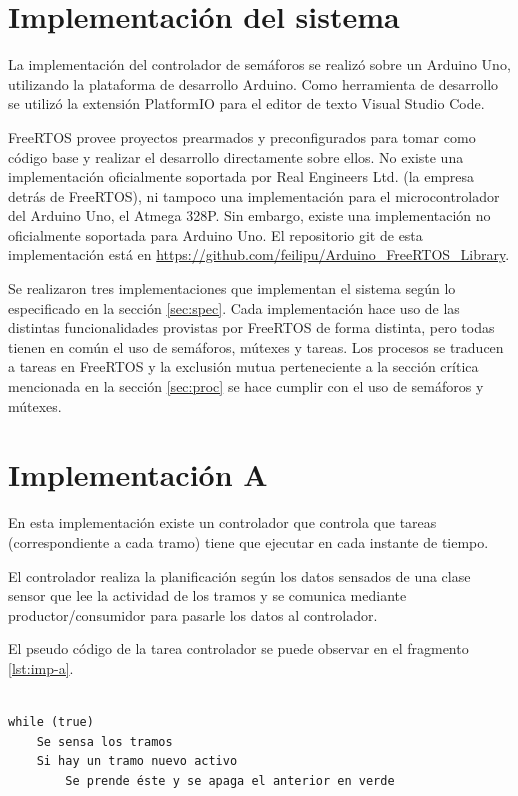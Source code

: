\section{Implementación del sistema}
La implementación del controlador de semáforos se realizó sobre un Arduino Uno, utilizando la plataforma de desarrollo Arduino. Como herramienta de desarrollo se utilizó la extensión PlatformIO para el editor de texto Visual Studio Code.

FreeRTOS provee proyectos prearmados y preconfigurados para tomar como código base y realizar el desarrollo directamente sobre ellos. No existe una implementación oficialmente soportada por Real Engineers Ltd. (la empresa detrás de FreeRTOS), ni tampoco una implementación para el microcontrolador del Arduino Uno, el Atmega 328P. Sin embargo, existe una implementación no oficialmente soportada para Arduino Uno. El repositorio git de esta implementación está en \url{https://github.com/feilipu/Arduino\_FreeRTOS\_Library}.

Se realizaron tres implementaciones que implementan el sistema según lo especificado en la sección \ref{sec:spec}. Cada implementación hace uso de las distintas funcionalidades provistas por FreeRTOS de forma distinta, pero todas tienen en común el uso de semáforos, mútexes y tareas. Los procesos se traducen a tareas en FreeRTOS y la exclusión mutua perteneciente a la sección crítica mencionada en la sección \ref{sec:proc} se hace cumplir con el uso de semáforos y mútexes.

\section{Implementación A}
En esta implementación existe un controlador que controla que tareas (correspondiente a cada tramo) tiene que ejecutar en cada instante de tiempo.

El controlador realiza la planificación según los datos sensados de una clase sensor que lee la actividad de los tramos y se comunica mediante productor/consumidor para pasarle los datos al controlador.

El pseudo código de la tarea controlador se puede observar en el fragmento \ref{lst:imp-a}.
\begin{lstlisting}[label=lst:imp-a, caption=Pseudocódigo de la tarea controlador.]

while (true)
	Se sensa los tramos
	Si hay un tramo nuevo activo
		Se prende éste y se apaga el anterior en verde
		
\end{lstlisting}

